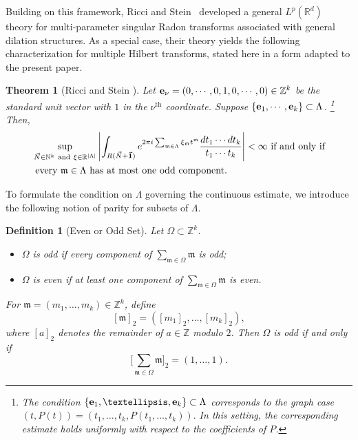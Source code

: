 \documentclass[10pt,a4paper]{amsart}
\newtheorem{theorem}{Theorem}\numberwithin{theorem}{section}
\newtheorem{definition}{Definition}\numberwithin{definition}{section}
\numberwithin{equation}{section}
\begin{document}
Building on this framework, Ricci and Stein~\cite{RS1} developed a general
$L^p(\mathbb R^d)$ theory for multi-parameter singular Radon transforms
associated with general dilation structures. As a special case, their
theory yields the following characterization for multiple Hilbert
transforms, stated here in a form adapted to the present paper.
\begin{theorem}[Ricci and Stein \cite{RS1}]\label{cho4}
	Let  ${\bf e}_\nu = (0, \cdots, 0, 1, 0, \cdots, 0) \in \mathbb{Z}^k$ be the standard unit vector with $1$ in the $\nu^{\text{th}}$ coordinate.  Suppose  $\{{\bf e}_1,\cdots,{\bf e}_k\}\subset \Lambda$. \footnote{The condition
		$\{{\bf e}_1,\ldots,{\bf e}_k\}\subset\Lambda$
		corresponds to the graph case
		$
		(t,P(t))=(t_1,\ldots,t_k,P(t_1,\ldots,t_k)).
		$
		In this setting, the corresponding estimate holds uniformly with respect to the coefficients of $P$.}
	Then,
	\begin{align*} 
		& \sup_{\vec{N}\in \mathbb{N}^k \   \text{and}\  \xi\in\mathbb{R}^{|\Lambda|}  }\left|\int_{  R(\vec{N}+\vec{\bf{1}})}e^{2\pi i \sum_{\mathfrak{m}\in\Lambda  } \xi_{\mathfrak{m}}t^\mathfrak{m}} \frac{ dt_1\cdots dt_k}{t_1\cdots t_k}\right|<\infty\ \text{if and only if}\nonumber\\
		& \text{ every $\mathfrak{m} \in \Lambda$ has at most one odd component.  }
	\end{align*}
\end{theorem}

To formulate the condition on $\Lambda$ governing the continuous
estimate, we introduce the following notion of parity for subsets of
$\Lambda$.
\begin{definition}[Even or Odd Set]\label{14a}
	Let $\Omega\subset \mathbb{Z}^k$. 
	
	\begin{itemize}
		\item
		$\Omega$ is \emph{odd} if every component of
		$\sum_{\mathfrak m\in\Omega}\mathfrak m$
		is odd;
		
		\item
		$\Omega$ is \emph{even} if at least one component of
		$\sum_{\mathfrak m\in\Omega}\mathfrak m$
		is even.
	\end{itemize}
	
	For $\mathfrak m=(m_1,\dots,m_k)\in\mathbb Z^k$, define
	\[
	[\mathfrak m]_2=([m_1]_2,\dots,[m_k]_2),
	\]
	where $[a]_2$ denotes the remainder of $a\in\mathbb Z$ modulo $2$.
	Then $\Omega$ is odd if and only if
	\[
	\Big[\sum_{\mathfrak m\in\Omega}\mathfrak m\Big]_2=(1,\dots,1).
	\]
\end{definition}
\end{document}
